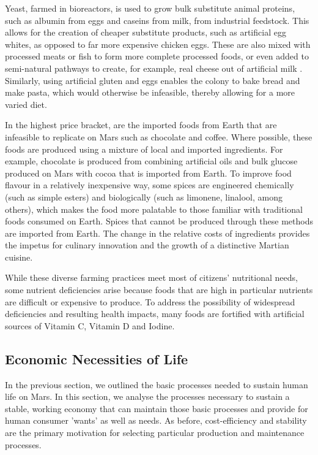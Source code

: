 \documentclass[fleqn,10pt]{Stylesheet} %
\begin{document}
Yeast, farmed in bioreactors, is used to grow bulk substitute animal proteins, such as albumin from eggs and caseins from milk, from industrial feedstock. This allows for the creation of cheaper substitute products, such as artificial egg whites, as opposed to far more expensive chicken eggs. These are also mixed with processed meats or fish to form more complete processed foods, or even added to semi-natural pathways to create, for example, real cheese out of artificial milk \cite{Pandya2017}. Similarly, using artificial gluten and eggs enables the colony to bake bread and make pasta, which would otherwise be infeasible, thereby allowing for a more varied diet.

In the highest price bracket, are the imported foods from Earth that are infeasible to replicate on Mars such as chocolate and coffee. Where possible, these foods are produced using a mixture of local and imported ingredients. For example, chocolate is produced from combining artificial oils and bulk glucose produced on Mars with cocoa that is imported from Earth. To improve food flavour in a relatively inexpensive way, some spices are engineered chemically (such as simple esters) and biologically (such as limonene, linalool, among others), which makes the food more palatable to those familiar with traditional foods consumed on Earth. Spices that cannot be produced through these methods are imported from Earth. The change in the relative costs of ingredients provides the impetus for culinary innovation and the growth of a distinctive Martian cuisine.

While these diverse farming practices meet most of citizens' nutritional needs, some nutrient deficiencies arise because foods that are high in particular nutrients are difficult or expensive to produce. To address the possibility of widespread deficiencies and resulting health impacts, many foods are fortified with artificial sources of Vitamin C, Vitamin D and Iodine.

\subsection{Economic Necessities of Life}

In the previous section, we outlined the basic processes needed to sustain human life on Mars. In this section, we analyse the processes necessary to sustain a stable, working economy that can maintain those basic processes and provide for human consumer 'wants' as well as needs. As before, cost-efficiency and stability are the primary motivation for selecting particular production and maintenance processes. 
\end{document}
